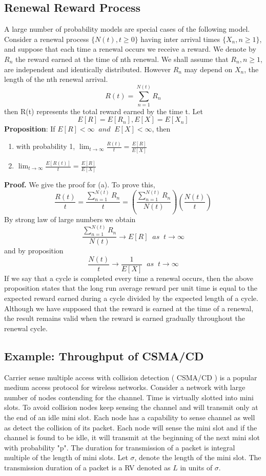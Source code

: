 \subsection{Renewal Reward Process}
A large number of probability models are special cases of the following model. Consider a renewal process $\{N(t), t \geq 0\}$ having inter arrival times $\{X_{n},n \geq 1\}$, and suppose that each time a renewal occurs we receive a reward. We denote by $R_{n}$ the reward earned at the time of nth renewal. We shall assume that $R_{n}, n \geq 1$, are independent and identically distributed. However $R_{n}$ may depend on $X_{n}$, the length of the nth renewal arrival. 
\[R(t) = \sum_{n=1}^{N(t)}R_{n}\]
then R(t) represents the total reward earned by the time t. Let 
\[E[R] = E[R_{n}], E[X] = E[X_{n}]\] 
\textbf{Proposition}: If $E[R] < \infty \;\; and \;\; E[X] < \infty$, then 
\begin{enumerate}
    \item[(a)] with probability 1, $      \lim_{t\to\infty} \frac{R(t)}{t} = \frac{E[R]}{E[X]}$
    \item[(b)]  $\lim_{t\to\infty} \frac{E[R(t)]}{t} = \frac{E[R]}{E[X]}$
\end{enumerate}
\textbf{Proof.} We give the proof for (a). To prove this, 
\begin{equation*}
    \frac{R(t)}{t} = \frac{\sum_{n=1}^{N(t)}R_{n}}{t} = \left(\frac{\sum_{n=1}^{N(t)}R_{n}}{N(t)}\right)\left(\frac{N(t)}{t}\right)
\end{equation*}
By strong law of large numbers we obtain 
\[\frac{\sum_{n=1}^{N(t)}R_{n}}{N(t)} \to E[R] \;\; as \;\; t\to \infty\] 
and by proposition 
\begin{equation*}
    \frac{N(t)}{t} \to \frac{1}{E[X]} \;\; as \;\; t \to \infty
\end{equation*} 
If we say that a cycle is completed every time a renewal occurs, then the above proposition states that the long run average reward per unit time is equal to the expected reward earned during a cycle divided by the expected length of a cycle. \newline
Although we have supposed that the reward is earned at the time of a renewal, the result remains valid when the reward is earned gradually throughout the renewal cycle. 
\subsection{Example: Throughput of CSMA/CD }
Carrier sense multiple access with collision detection ( CSMA/CD )  is a popular medium access protocol for wireless networks. Consider a network with large number of nodes contending for the channel. Time is virtually slotted into mini slots. To avoid collision nodes keep sensing the channel and will transmit only at the end of an idle mini slot. Each node has a capability to sense channel as well as detect the collision of its packet. Each node will sense the mini slot and if the channel is found to be 
idle, it will transmit at the beginning of the next mini slot with probability "p". The duration for transmission of a packet is integral multiple of the length of mini slots. 
Let $\sigma$, denote the length of the mini slot.
The transmission duration of a packet is a  RV denoted as $L$ in units of $\sigma$.

